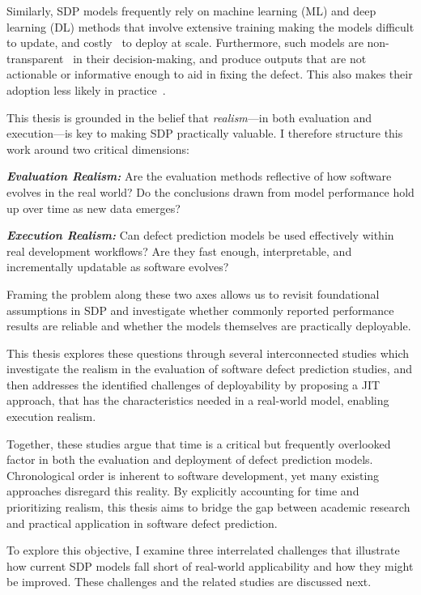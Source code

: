 \documentclass[\main/thesis.tex]{subfiles}
\begin{document}
Similarly, SDP models frequently rely on machine learning (ML) and deep learning (DL) methods that involve extensive training making the models difficult to update, and costly~\cite{shen2024efficient,justus2018predicting} to deploy at scale. Furthermore, such models are non-transparent~\cite{dam2018explainable,grattan2024need} in their decision-making, and produce outputs that are not actionable or informative enough to aid in fixing the defect.
This also makes their adoption less likely in practice~\cite{grattan2024need}.

This thesis is grounded in the belief that \textit{realism}---in both evaluation and execution---is key to making SDP practically valuable. I therefore structure this work around two critical dimensions:

\textbf{\textit{Evaluation Realism:}} Are the evaluation methods reflective of how software evolves in the real world? Do the conclusions drawn from model performance hold up over time as new data emerges?

\textbf{\textit{Execution Realism:}} Can defect prediction models be used effectively within real development workflows? Are they fast enough, interpretable, and incrementally updatable as software evolves? 

Framing the problem along these two axes allows us to revisit foundational assumptions in SDP and investigate whether commonly reported performance results are reliable and whether the models themselves are practically deployable.

This thesis explores these questions through several interconnected studies which investigate the realism in the evaluation of software defect prediction studies, and then addresses the identified challenges of deployability by proposing a JIT approach, that has the characteristics needed in a  real-world model, enabling execution realism.  

Together, these studies argue that time is a critical but frequently overlooked factor in both the evaluation and deployment of defect prediction models.
Chronological order is inherent to software development, yet many existing approaches disregard this reality. By explicitly accounting for time and prioritizing realism, this thesis aims to bridge the gap between academic research and practical application in software defect prediction.

To explore this objective, I examine three interrelated challenges that illustrate how current SDP models fall short of real-world applicability and how they might be improved. These challenges and the related studies are discussed next.
\end{document}
